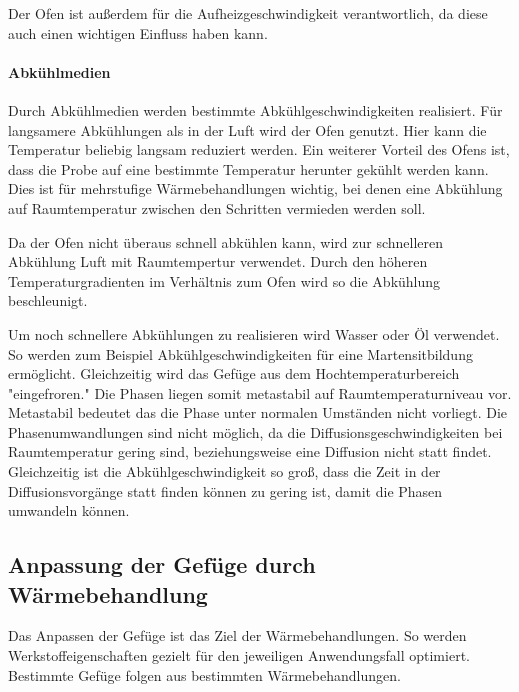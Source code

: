 \documentclass[a4paper, singlepage, 11pt]{tubsreprt}
\begin{document}
Der Ofen ist außerdem für die Aufheizgeschwindigkeit verantwortlich, da diese auch einen wichtigen Einfluss haben kann.
\paragraph{Abkühlmedien}

Durch Abkühlmedien werden bestimmte Abkühlgeschwindigkeiten realisiert. Für langsamere Abkühlungen als in der Luft wird der Ofen genutzt. Hier kann die Temperatur beliebig langsam reduziert werden. Ein weiterer Vorteil des Ofens ist, dass die Probe auf eine bestimmte Temperatur herunter gekühlt werden kann. Dies ist für mehrstufige Wärmebehandlungen wichtig, bei denen eine Abkühlung auf Raumtemperatur zwischen den Schritten vermieden werden soll. 

Da der Ofen nicht überaus schnell abkühlen kann, wird zur schnelleren Abkühlung Luft mit Raumtempertur verwendet. Durch den höheren Temperaturgradienten im Verhältnis zum Ofen wird so die Abkühlung beschleunigt.  

Um noch schnellere Abkühlungen zu realisieren wird Wasser oder Öl verwendet. So werden zum Beispiel Abkühlgeschwindigkeiten für eine Martensitbildung ermöglicht. Gleichzeitig wird das Gefüge aus dem Hochtemperaturbereich "eingefroren." Die Phasen liegen somit metastabil auf Raumtemperaturniveau vor. Metastabil bedeutet das die Phase unter normalen Umständen nicht vorliegt. Die Phasenumwandlungen sind nicht möglich, da die Diffusionsgeschwindigkeiten bei Raumtemperatur gering sind, beziehungsweise eine Diffusion nicht statt findet. Gleichzeitig ist die Abkühlgeschwindigkeit so groß, dass die Zeit in der Diffusionsvorgänge statt finden können zu gering ist, damit die Phasen umwandeln können.
\subsection*{Anpassung der Gefüge durch Wärmebehandlung}

Das Anpassen der Gefüge ist das Ziel der Wärmebehandlungen. So werden Werkstoffeigenschaften gezielt für den jeweiligen Anwendungsfall optimiert. Bestimmte Gefüge folgen aus bestimmten Wärmebehandlungen.


\listoffigures
\listoftables
\end{document}
